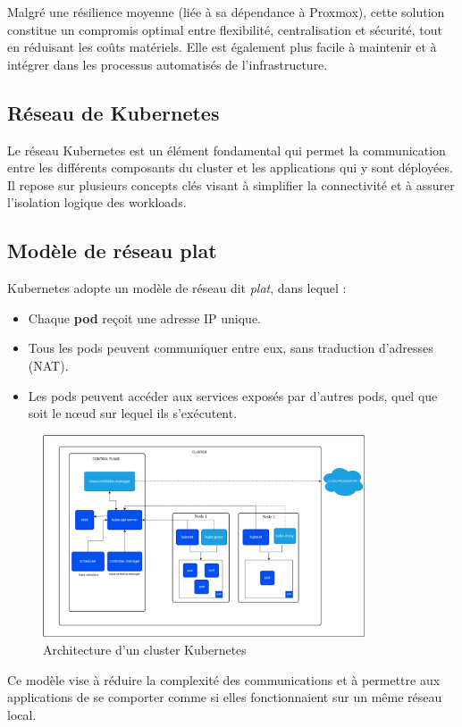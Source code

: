 Malgré une résilience moyenne (liée à sa dépendance à Proxmox), cette solution constitue un compromis optimal entre flexibilité, centralisation et sécurité, tout en réduisant les coûts matériels. Elle est également plus facile à maintenir et à intégrer dans les processus automatisés de l'infrastructure.

\subsection{Réseau de Kubernetes}

Le réseau Kubernetes est un élément fondamental qui permet la communication entre les différents composants du cluster et les applications qui y sont déployées. Il repose sur plusieurs concepts clés visant à simplifier la connectivité et à assurer l’isolation logique des workloads.

\subsection{Modèle de réseau plat}

Kubernetes adopte un modèle de réseau dit \emph{plat}, dans lequel :
\begin{itemize}
	\item Chaque \textbf{pod} reçoit une adresse IP unique.
	\item Tous les pods peuvent communiquer entre eux, sans traduction d’adresses (NAT).
	\item Les pods peuvent accéder aux services exposés par d’autres pods, quel que soit le nœud sur lequel ils s’exécutent.
\end{itemize}
\begin{figure}[H]
	\centering
	\includegraphics[width=0.85\textwidth]{figures/kubernetes-cluster-architecture.png}
	\caption{Architecture d'un cluster Kubernetes}
\end{figure}
Ce modèle vise à réduire la complexité des communications et à permettre aux applications de se comporter comme si elles fonctionnaient sur un même réseau local.

